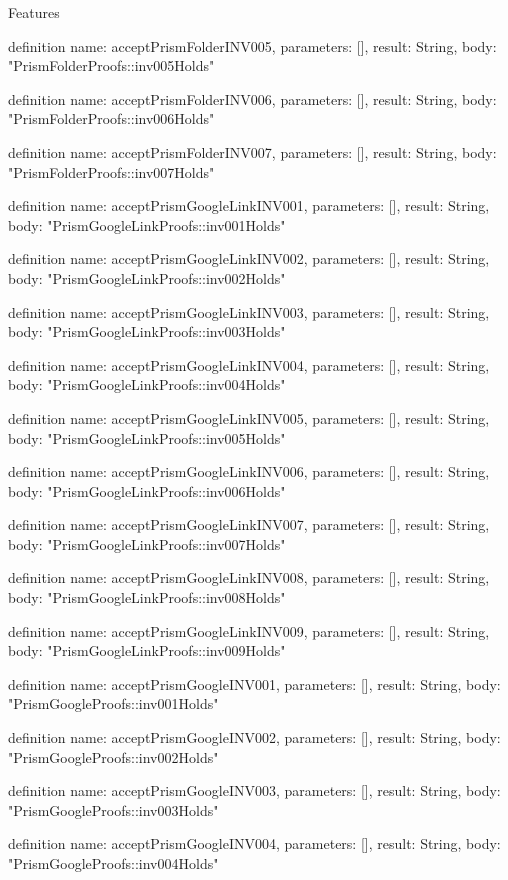 \begin{lexlean}{Features}
\begin{semanticmodule}
definition{
  name: acceptPrismFolderINV005,
  parameters: [],
  result: String,
  body: "PrismFolderProofs::inv005Holds"
}

definition{
  name: acceptPrismFolderINV006,
  parameters: [],
  result: String,
  body: "PrismFolderProofs::inv006Holds"
}

definition{
  name: acceptPrismFolderINV007,
  parameters: [],
  result: String,
  body: "PrismFolderProofs::inv007Holds"
}

definition{
  name: acceptPrismGoogleLinkINV001,
  parameters: [],
  result: String,
  body: "PrismGoogleLinkProofs::inv001Holds"
}

definition{
  name: acceptPrismGoogleLinkINV002,
  parameters: [],
  result: String,
  body: "PrismGoogleLinkProofs::inv002Holds"
}

definition{
  name: acceptPrismGoogleLinkINV003,
  parameters: [],
  result: String,
  body: "PrismGoogleLinkProofs::inv003Holds"
}

definition{
  name: acceptPrismGoogleLinkINV004,
  parameters: [],
  result: String,
  body: "PrismGoogleLinkProofs::inv004Holds"
}

definition{
  name: acceptPrismGoogleLinkINV005,
  parameters: [],
  result: String,
  body: "PrismGoogleLinkProofs::inv005Holds"
}

definition{
  name: acceptPrismGoogleLinkINV006,
  parameters: [],
  result: String,
  body: "PrismGoogleLinkProofs::inv006Holds"
}

definition{
  name: acceptPrismGoogleLinkINV007,
  parameters: [],
  result: String,
  body: "PrismGoogleLinkProofs::inv007Holds"
}

definition{
  name: acceptPrismGoogleLinkINV008,
  parameters: [],
  result: String,
  body: "PrismGoogleLinkProofs::inv008Holds"
}

definition{
  name: acceptPrismGoogleLinkINV009,
  parameters: [],
  result: String,
  body: "PrismGoogleLinkProofs::inv009Holds"
}

definition{
  name: acceptPrismGoogleINV001,
  parameters: [],
  result: String,
  body: "PrismGoogleProofs::inv001Holds"
}

definition{
  name: acceptPrismGoogleINV002,
  parameters: [],
  result: String,
  body: "PrismGoogleProofs::inv002Holds"
}

definition{
  name: acceptPrismGoogleINV003,
  parameters: [],
  result: String,
  body: "PrismGoogleProofs::inv003Holds"
}

definition{
  name: acceptPrismGoogleINV004,
  parameters: [],
  result: String,
  body: "PrismGoogleProofs::inv004Holds"
}


\end{semanticmodule}
\end{lexlean}
